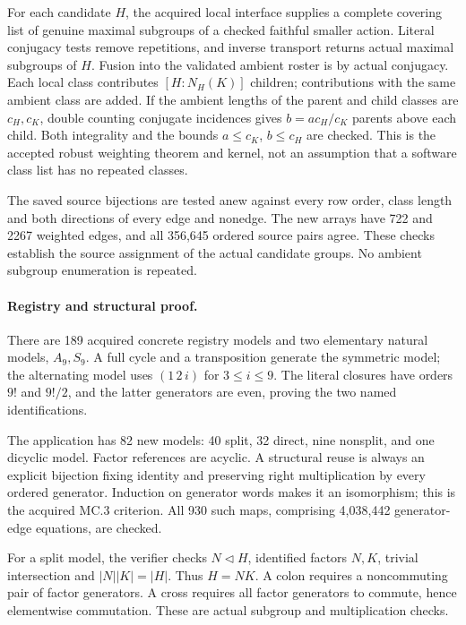 \documentclass[11pt]{article}
\begin{document}
For each candidate $H$, the acquired local interface supplies a complete
covering list of genuine maximal subgroups of a checked faithful smaller
action. Literal conjugacy tests remove repetitions, and inverse transport
returns actual maximal subgroups of $H$. Fusion into the validated ambient
roster is by actual conjugacy. Each local class contributes
$[H:N_H(K)]$ children; contributions with the same ambient class are added.
If the ambient lengths of the parent and child classes are $c_H,c_K$,
double counting conjugate incidences gives $b=a c_H/c_K$ parents above
each child. Both integrality and the bounds $a\leq c_K$, $b\leq c_H$
are checked. This is the accepted robust weighting theorem and kernel,
not an assumption that a software class list has no repeated classes.

The saved source bijections are tested anew against every row order,
class length and both directions of every edge and nonedge. The new
arrays have 722 and 2267 weighted edges, and all 356,645 ordered source
pairs agree. These checks establish the source assignment of the actual
candidate groups. No ambient subgroup enumeration is repeated.

\newpage
\paragraph{Registry and structural proof.}
There are 189 acquired concrete registry models and two elementary
natural models, $A_9,S_9$. A full cycle and a transposition generate the
symmetric model; the alternating model uses $(1\,2\,i)$ for $3\leq i\leq9$.
The literal closures have orders $9!$ and $9!/2$, and the latter generators
are even, proving the two named identifications.

The application has 82 new models: 40 split, 32 direct, nine nonsplit,
and one dicyclic model. Factor references are acyclic. A structural reuse
is always an explicit bijection fixing identity and preserving right
multiplication by every ordered generator. Induction on generator words
makes it an isomorphism; this is the acquired MC.3 criterion.
All 930 such maps, comprising 4,038,442 generator-edge equations, are checked.

For a split model, the verifier checks $N\triangleleft H$, identified
factors $N,K$, trivial intersection and $|N||K|=|H|$. Thus $H=NK$.
A colon requires a noncommuting pair of factor generators. A cross
requires all factor generators to commute, hence elementwise commutation.
These are actual subgroup and multiplication checks.
\end{document}

